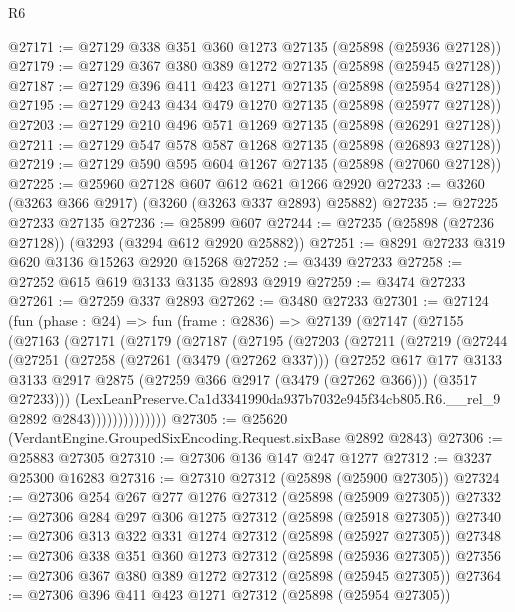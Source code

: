 \begin{lexlean}{R6}
\begin{coremodule}
@27171 := @27129 @338 @351 @360 @1273 @27135 (@25898 (@25936 @27128))
@27179 := @27129 @367 @380 @389 @1272 @27135 (@25898 (@25945 @27128))
@27187 := @27129 @396 @411 @423 @1271 @27135 (@25898 (@25954 @27128))
@27195 := @27129 @243 @434 @479 @1270 @27135 (@25898 (@25977 @27128))
@27203 := @27129 @210 @496 @571 @1269 @27135 (@25898 (@26291 @27128))
@27211 := @27129 @547 @578 @587 @1268 @27135 (@25898 (@26893 @27128))
@27219 := @27129 @590 @595 @604 @1267 @27135 (@25898 (@27060 @27128))
@27225 := @25960 @27128 @607 @612 @621 @1266 @2920
@27233 := @3260 (@3263 @366 @2917) (@3260 (@3263 @337 @2893) @25882)
@27235 := @27225 @27233 @27135
@27236 := @25899 @607
@27244 := @27235 (@25898 (@27236 @27128)) (@3293 (@3294 @612 @2920 @25882))
@27251 := @8291 @27233 @319 @620 @3136 @15263 @2920 @15268
@27252 := @3439 @27233
@27258 := @27252 @615 @619 @3133 @3135 @2893 @2919
@27259 := @3474 @27233
@27261 := @27259 @337 @2893
@27262 := @3480 @27233
@27301 := @27124
    (fun (phase : @24) =>
    fun (frame : @2836) =>
    @27139
      (@27147
        (@27155
          (@27163
            (@27171
              (@27179
                (@27187
                  (@27195
                    (@27203
                      (@27211
                        (@27219
                          (@27244
                            (@27251
                              (@27258
                                (@27261 (@3479 (@27262 @337)))
                                (@27252
                                  @617
                                  @177
                                  @3133
                                  @3133
                                  @2917
                                  @2875
                                  (@27259 @366 @2917 (@3479 (@27262 @366)))
                                  (@3517 @27233)))
                              (LexLeanPreserve.Ca1d3341990da937b7032e945f34cb805.R6.__rel_9
                                @2892
                                @2843))))))))))))))
@27305 := @25620 (VerdantEngine.GroupedSixEncoding.Request.sixBase @2892 @2843)
@27306 := @25883 @27305
@27310 := @27306 @136 @147 @247 @1277
@27312 := @3237 @25300 @16283
@27316 := @27310 @27312 (@25898 (@25900 @27305))
@27324 := @27306 @254 @267 @277 @1276 @27312 (@25898 (@25909 @27305))
@27332 := @27306 @284 @297 @306 @1275 @27312 (@25898 (@25918 @27305))
@27340 := @27306 @313 @322 @331 @1274 @27312 (@25898 (@25927 @27305))
@27348 := @27306 @338 @351 @360 @1273 @27312 (@25898 (@25936 @27305))
@27356 := @27306 @367 @380 @389 @1272 @27312 (@25898 (@25945 @27305))
@27364 := @27306 @396 @411 @423 @1271 @27312 (@25898 (@25954 @27305))

\end{coremodule}
\end{lexlean}
